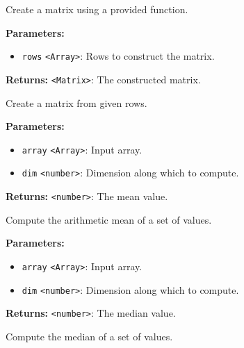 \documentclass[12pt,a4paper]{article}
\begin{document}
\noindent Create a matrix using a provided function.

\vspace{5mm}
\noindent {}


\noindent \textbf{Parameters:}
\begin{itemize}
  \item \texttt{rows} \texttt{<Array>}: Rows to construct the matrix.
\end{itemize}

\noindent \textbf{Returns:} \texttt{<Matrix>}: The constructed matrix.

\noindent Create a matrix from given rows.

\vspace{5mm}
\noindent {}


\noindent \textbf{Parameters:}
\begin{itemize}
  \item \texttt{array} \texttt{<Array>}: Input array.
  \item \texttt{dim} \texttt{<number>}: Dimension along which to compute.
\end{itemize}

\noindent \textbf{Returns:} \texttt{<number>}: The mean value.

\noindent Compute the arithmetic mean of a set of values.

\vspace{5mm}
\noindent {}


\noindent \textbf{Parameters:}
\begin{itemize}
  \item \texttt{array} \texttt{<Array>}: Input array.
  \item \texttt{dim} \texttt{<number>}: Dimension along which to compute.
\end{itemize}

\noindent \textbf{Returns:} \texttt{<number>}: The median value.

\noindent Compute the median of a set of values.

\vspace{5mm}
\noindent {}
\end{document}
